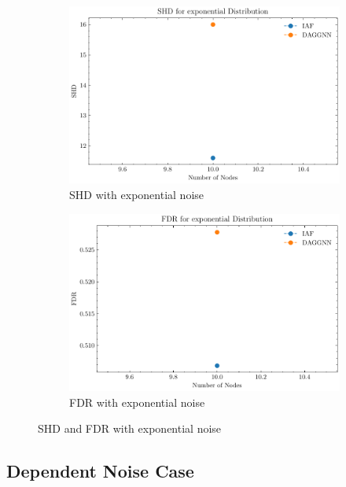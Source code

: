 \documentclass[10pt]{article}
\begin{document}
\begin{figure}[H]
    \centering
    \begin{subfigure}{0.45\textwidth}
        \includegraphics[width=\textwidth]{fig/SHD_independence_exponential.pdf}
        \caption{SHD with exponential noise}
        \label{SHD_exponential}
    \end{subfigure}
    \hfill
    \begin{subfigure}{0.45\textwidth}
        \includegraphics[width=\textwidth]{fig/FDR_independence_exponential.pdf}
        \caption{FDR with exponential noise}
        \label{FDR_exponential}
    \end{subfigure}
    \caption{SHD and FDR with exponential noise}
    \label{SHD_FDR_exponential}
\end{figure}

\subsection{Dependent Noise Case}
\end{document}

